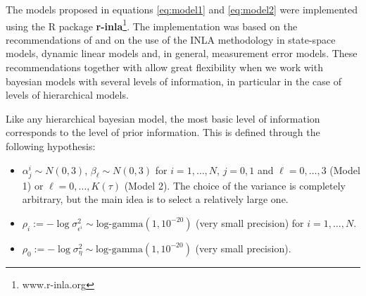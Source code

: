 \documentclass[11pt]{amsart}
\theoremstyle{plain}
\theoremstyle{definition}
\theoremstyle{remark}
\begin{document}
The models proposed in equations \eqref{eq:model1} and \eqref{eq:model2} were
implemented using the R package \textbf{r-inla}\footnote{www.r-inla.org}. The
implementation was based on the recommendations of \cite{Ruiz-Cardenas2012} and
\cite{Muff2015} on the use of the INLA methodology in state-space models,
dynamic linear models and, in general, measurement error models. These
recommendations together with \cite{Martins2013} allow
great flexibility when we work with bayesian models with several levels of
information, in particular in the case of levels of hierarchical models.

Like any hierarchical bayesian model, the most basic level of information
corresponds to the level of prior information. This is defined through the
following hypothesis:
\begin{itemize}
\item $\alpha^i_j\sim N(0,3)$, $\beta_\ell \sim N(0,3)$ for $i=1,\ldots,N$, $j=0,1$ and $\ell=0,\ldots,3$
  (Model 1) or $\ell=0,\ldots,K(\tau)$ (Model 2). The choice of the variance is
  completely arbitrary, but the main idea is to select a relatively large one.
  
\item $\rho_i := -\log \sigma^2_{\epsilon^i}\sim \text{log-gamma}(1,10^{-20})$
  (very small precision) for $i=1,\ldots,N$.
  
\item $\rho_0 := -\log \sigma^2_\eta \sim \text{log-gamma}(1,10^{-20})$ (very
  small precision).
\end{itemize}
\end{document}
